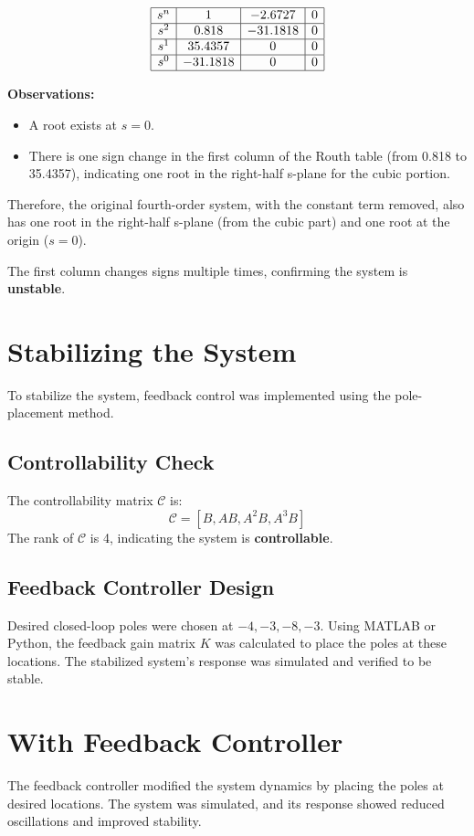 \documentclass[a4paper,12pt]{article}
\begin{document}
\[
\begin{array}{|c|c|c|c|}
\hline
s^n & 1 & -2.6727 & 0 \\
\hline
s^2 & 0.818 & -31.1818 & 0 \\
\hline
s^1 & 35.4357 & 0 & 0 \\
\hline
s^0 & -31.1818 & 0 & 0 \\
\hline
\end{array}
\]

\textbf{Observations:}
\begin{itemize}
    \item A root exists at $s=0$.
    \item There is one sign change in the first column of the Routh table (from 0.818 to 35.4357), indicating one root in the right-half s-plane for the cubic portion.
\end{itemize}
Therefore, the original fourth-order system, with the constant term removed, also has one root in the right-half s-plane (from the cubic part) and one root at the origin ($s=0$).

The first column changes signs multiple times, confirming the system is \textbf{unstable}.



\section*{Stabilizing the System}
To stabilize the system, feedback control was implemented using the pole-placement method.

\subsection*{Controllability Check}
The controllability matrix \( \mathcal{C} \) is:
\[
\mathcal{C} = [B, AB, A^2B, A^3B]
\]
The rank of \( \mathcal{C} \) is 4, indicating the system is \textbf{controllable}.

\subsection*{Feedback Controller Design}
Desired closed-loop poles were chosen at \( -4, -3, -8, -3 \). Using MATLAB or Python, the feedback gain matrix \( K \) was calculated to place the poles at these locations. The stabilized system's response was simulated and verified to be stable.

\section*{With Feedback Controller}
The feedback controller modified the system dynamics by placing the poles at desired locations. The system was simulated, and its response showed reduced oscillations and improved stability.
\end{document}
